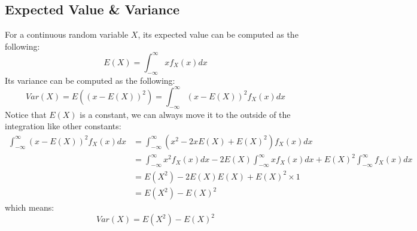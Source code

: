 \documentclass[11pt]{article}
\begin{document}
\subsection{Expected Value \& Variance}
For a continuous random variable $X$, its expected value can be computed as the following:
$$E(X) = \int_{-\infty}^{\infty} xf_X(x) dx$$
\noindent Its variance can be computed as the following:
$$Var(X) = E((x - E(X))^2) = \int_{-\infty}^{\infty} (x - E(X))^2 f_X(x) dx$$
Notice that $E(X)$ is a constant, we can always move it to the outside of the integration like other constants:
\begin{align*}
  \int_{-\infty}^{\infty} (x - E(X))^2 f_X(x) dx &= \int_{-\infty}^{\infty} (x^2 - 2xE(X) + E(X)^2) f_X(x) dx 
  \\ &= \int_{-\infty}^{\infty} x^2 f_X(x) dx - 2E(X) \int_{-\infty}^{\infty} xf_X(x)dx + E(X)^2 \int_{-\infty}^{\infty} f_X(x)dx
  \\ &= E(X^2) - 2E(X) E(X) + E(X)^2 \times 1
  \\ &= E(X^2) - E(X)^2
\end{align*}
which means:
$$Var(X) = E(X^2) - E(X)^2$$
\end{document}
